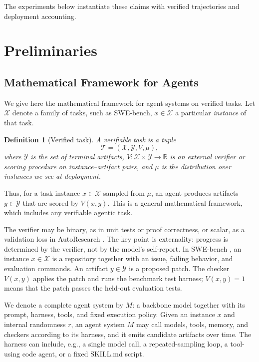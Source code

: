 \documentclass{article}
\newtheorem{definition}{Definition}
\newcommand{\cX}{\mathcal{X}}
\newcommand{\cY}{\mathcal{Y}}
\begin{document}
The experiments below instantiate these claims with verified trajectories and deployment accounting.

\section{Preliminaries}
\label{sec:framework}

\subsection{Mathematical Framework for Agents}
We give here the mathematical framework for agent systems on verified tasks. Let \(\mathcal X\) denote a family of tasks, such as
SWE-bench, \(x\in\mathcal X\) a particular \textit{instance} of that task.

\begin{definition}[Verified task]
\label{def:verified-task}
A verifiable task is a tuple
\[
\mathcal T=(\mathcal X,\mathcal Y,V,\mu),
\]
where $\mathcal Y$ is the set of terminal artifacts,
$V: \mathcal{X} \times \mathcal{Y} \to \mathbb R$ is an external verifier or scoring procedure on instance--artifact pairs, and
$\mu$ is the distribution over instances we see at deployment.
\end{definition}
Thus, for a task instance $x\in\mathcal X$ sampled from $\mu$, an agent produces artifacts $y\in\mathcal Y$ that are scored by $V(x,y)$. This is a general mathematical framework, which includes any verifiable agentic task.

The verifier may be binary, as in unit tests or proof correctness, or scalar, as a validation loss in AutoResearch \citep{karpathy2026autoresearch}.
The key point is externality: progress is determined by the verifier, not by the model's self-report.
In SWE-bench \citet{jimenez2024swebench}, an instance \(x\in\cX\) is a repository together with an issue, failing behavior, and evaluation commands.
An artifact \(y\in\cY\) is a proposed patch.
The checker \(V(x,y)\) applies the patch and runs the benchmark test harness; \(V(x,y)=1\) means that the patch passes the held-out evaluation tests.

We denote a complete agent system by \(M\): a backbone model together with its prompt, harness, tools, and fixed execution policy.
Given an instance \(x\) and internal randomness \(r\), an agent system \(M\) may call models, tools, memory, and checkers according to its harness, and it emits candidate artifacts over time. The harness can include, e.g., a single model call, a repeated-sampling loop, a tool-using code agent, or a fixed SKILL.md script.
\end{document}
